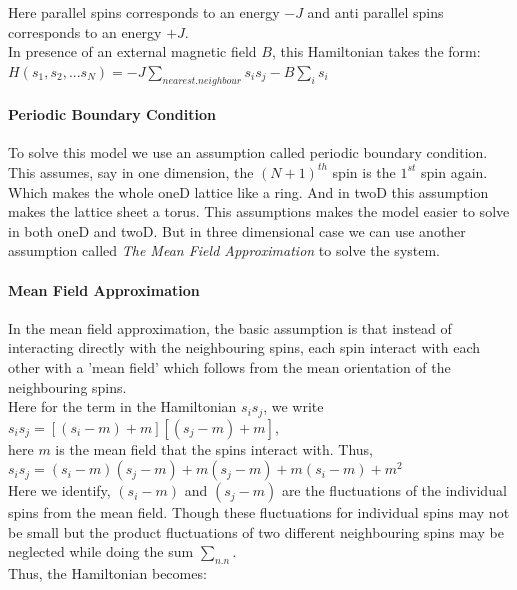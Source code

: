 \documentclass[20pt]{article}
\begin{document}
Here parallel spins corresponds to an energy $-J$ and anti parallel spins corresponds to an energy $+J$.\\
In presence of an external magnetic field $B$, this Hamiltonian takes the form:\\

$H(s_1,s_2,...s_N)=-J \sum_{nearest.neighbour} s_i s_j - B \sum_{i} s_i$

\paragraph{Periodic Boundary Condition \\}
To solve this model we use an assumption called periodic boundary condition. This assumes, say in one dimension, the $(N+1)^{th}$ spin is the $1^{st}$ spin again. Which makes the whole oneD lattice like a ring. And in twoD this assumption makes the  lattice sheet a torus. This assumptions makes the model easier to solve in both oneD and twoD. But in three dimensional case we can use another assumption called \textit{The Mean Field Approximation } to solve the system.\\

\paragraph{ Mean Field Approximation\\}
In the mean field approximation, the basic assumption is that instead of interacting directly with the neighbouring spins, each spin interact with each other with a 'mean field' which follows from the mean orientation of the neighbouring spins.\\

Here for the term in the Hamiltonian $s_i s_j$, we write\\

$s_i s_j = [(s_i - m)+m][(s_j - m)+ m]$,\\ 

here $m$ is the mean field that the spins interact with. Thus,\\


$s_i s_j  = (s_i - m)(s_j - m) + m(s_j - m) + m(s_i - m)+ m^2$ \\


Here we identify, $(s_i - m)$ and $(s_j - m)$ are the fluctuations of the individual spins from the mean field. Though these fluctuations for individual spins may not be small but the product fluctuations of two different neighbouring spins  may be neglected while doing the sum $\sum_{n.n}$.\\
Thus, the Hamiltonian becomes:\\
\end{document}
